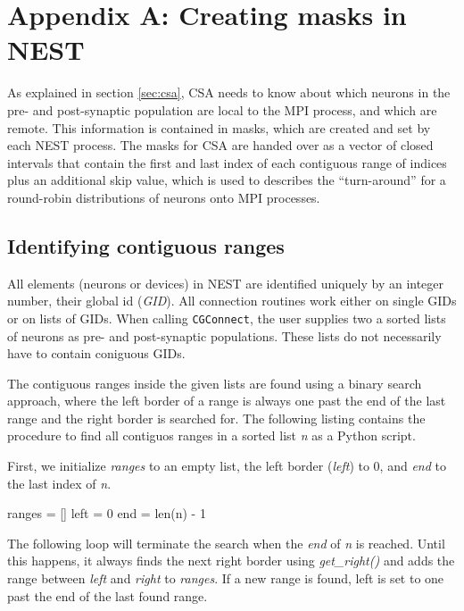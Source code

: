 \documentclass{frontiersSCNS} %
\begin{document}
\section*{Appendix A: Creating masks in NEST}\label{sec:creating_masks}

As explained in section \ref{sec:csa}, CSA needs to know about which
neurons in the pre- and post-synaptic population are local to the MPI
process, and which are remote. This information is contained in masks,
which are created and set by each NEST process. The masks for CSA are
handed over as a vector of closed intervals that contain the first and
last index of each contiguous range of indices plus an additional skip
value, which is used to describes the ``turn-around'' for a round-robin
distributions of neurons onto MPI processes.

\subsection*{Identifying contiguous ranges}

All elements (neurons or devices) in NEST are identified uniquely by
an integer number, their global id (\emph{GID}). All connection
routines work either on single GIDs or on lists of GIDs. When calling
\verb|CGConnect|, the user supplies two a sorted lists of neurons as
pre- and post-synaptic populations. These lists do not necessarily
have to contain coniguous GIDs.

The contiguous ranges inside the given lists are found using a binary
search approach, where the left border of a range is always one past
the end of the last range and the right border is searched for. The
following listing contains the procedure to find all contiguos ranges
in a sorted list \emph{n} as a Python script.

First, we initialize \emph{ranges} to an empty list, the left border
(\emph{left}) to 0, and \emph{end} to the last index of \emph{n}.

\begin{pythoncode}
ranges = []
left = 0
end = len(n) - 1
\end{pythoncode}

The following loop will terminate the search when the \emph{end} of
\emph{n} is reached. Until this happens, it always finds the next
right border using \emph{get\_right()} and adds the range between
\emph{left} and \emph{right} to \emph{ranges}. If a new range is
found, left is set to one past the end of the last found range.
\end{document}

